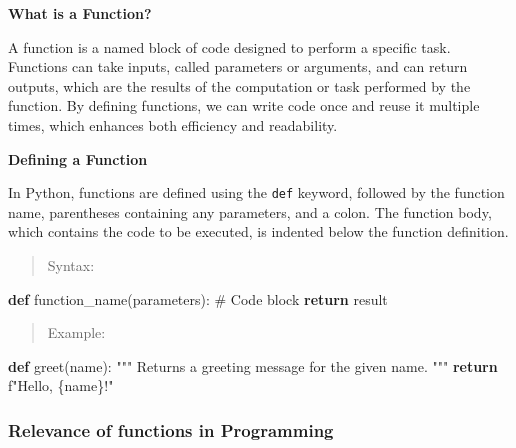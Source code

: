 \documentclass[
  letterpaper,
  DIV=11,
  numbers=noendperiod]{scrreprt}
\newenvironment{Shaded}{\begin{snugshade}}{\end{snugshade}}
\newcommand{\CommentTok}[1]{\textcolor[rgb]{0.37,0.37,0.37}{#1}}
\newcommand{\ControlFlowTok}[1]{\textcolor[rgb]{0.00,0.23,0.31}{\textbf{#1}}}
\newcommand{\KeywordTok}[1]{\textcolor[rgb]{0.00,0.23,0.31}{\textbf{#1}}}
\newcommand{\NormalTok}[1]{\textcolor[rgb]{0.00,0.23,0.31}{#1}}
\newcommand{\SpecialCharTok}[1]{\textcolor[rgb]{0.37,0.37,0.37}{#1}}
\newcommand{\SpecialStringTok}[1]{\textcolor[rgb]{0.13,0.47,0.30}{#1}}
\theoremstyle{plain}
\theoremstyle{definition}
\theoremstyle{remark}
\begin{document}
\textbf{What is a Function?}

A function is a named block of code designed to perform a specific task.
Functions can take inputs, called parameters or arguments, and can
return outputs, which are the results of the computation or task
performed by the function. By defining functions, we can write code once
and reuse it multiple times, which enhances both efficiency and
readability.

\textbf{Defining a Function}

In Python, functions are defined using the \texttt{def} keyword,
followed by the function name, parentheses containing any parameters,
and a colon. The function body, which contains the code to be executed,
is indented below the function definition.

\begin{quote}
Syntax:
\end{quote}

\begin{Shaded}
\begin{Highlighting}[]
\KeywordTok{def}\NormalTok{ function\_name(parameters):}
    \CommentTok{\# Code block}
    \ControlFlowTok{return}\NormalTok{ result}
\end{Highlighting}
\end{Shaded}

\begin{quote}
Example:
\end{quote}

\begin{Shaded}
\begin{Highlighting}[]
\KeywordTok{def}\NormalTok{ greet(name):}
    \CommentTok{"""}
\CommentTok{    Returns a greeting message for the given name.}
\CommentTok{    """}
    \ControlFlowTok{return} \SpecialStringTok{f"Hello, }\SpecialCharTok{\{}\NormalTok{name}\SpecialCharTok{\}}\SpecialStringTok{!"}
\end{Highlighting}
\end{Shaded}

\subsubsection{Relevance of functions in
Programming}\label{relevance-of-functions-in-programming}
\end{document}
